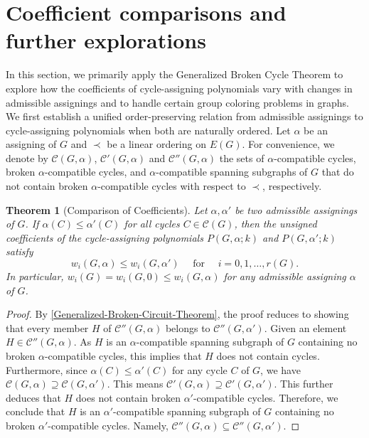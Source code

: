 \documentclass[12pt]{article}%
\numberwithin{equation}{section}
\newtheorem{theorem}{Theorem}[section]
\begin{document}
\section{Coefficient comparisons and further explorations}\label{Sec4}
In this section, we primarily apply the Generalized Broken Cycle Theorem to explore how the coefficients of cycle-assigning polynomials vary with changes in admissible assignings and to handle certain group coloring problems in graphs. We first establish a unified order-preserving relation from admissible assignings to cycle-assigning polynomials when both are naturally ordered.  Let $\alpha$ be an assigning of $G$ and $\prec$ be a linear ordering on $E(G)$. For convenience, we denote by $\mathcal{C}(G,\alpha)$, $\mathcal{C}'(G,\alpha)$ and  $\mathcal{C}''(G,\alpha)$ the sets of $\alpha$-compatible cycles, broken $\alpha$-compatible cycles, and $\alpha$-compatible spanning subgraphs of $G$ that do not contain  broken $\alpha$-compatible cycles with respect to $\prec$, respectively. 
\begin{theorem}[Comparison of Coefficients]\label{Comparison}
Let $\alpha,\alpha'$ be two admissible assignings of $G$. If $\alpha(C)\le \alpha'(C)$ for all cycles $C\in \mathcal{C}(G)$, then the unsigned coefficients of the cycle-assigning polynomials $P(G,\alpha;k)$ and $P(G,\alpha';k)$ satisfy 
\[
w_i(G,\alpha)\le w_i(G,\alpha') \quad \mbox{ for }\quad i=0,1,\ldots,r(G).
\]
In particular, $w_i(G)=w_i(G,0)\le w_i(G,\alpha)$ for any admissible assigning $\alpha$ of $G$.
\end{theorem}
\begin{proof}
By \autoref{Generalized-Broken-Circuit-Theorem}, the proof  reduces to showing that every member $H$ of $\mathcal{C}''(G,\alpha)$ belongs to $\mathcal{C}''(G,\alpha')$. Given an element $H\in\mathcal{C}''(G,\alpha)$. As $H$ is an $\alpha$-compatible spanning subgraph of $G$ containing no  broken $\alpha$-compatible cycles, this implies that $H$ does not contain cycles. Furthermore, since $\alpha(C)\le\alpha'(C)$ for any cycle $C$ of $G$, we have $\mathcal{C}(G,\alpha)\supseteq\mathcal{C}(G,\alpha')$. This means $\mathcal{C}'(G,\alpha)\supseteq\mathcal{C}'(G,\alpha')$. This further deduces that $H$ does not contain  broken $\alpha'$-compatible cycles. Therefore, we conclude that $H$ is an $\alpha'$-compatible spanning subgraph of $G$ containing no  broken $\alpha'$-compatible cycles. Namely, $\mathcal{C}''(G,\alpha)\subseteq \mathcal{C}''(G,\alpha')$.
\end{proof}
\end{document}
